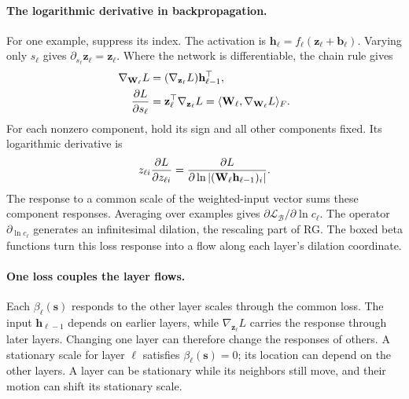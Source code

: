 \paragraph{The logarithmic derivative in backpropagation.}
For one example, suppress its index. The activation is
$\mathbf h_\ell=f_\ell(\mathbf z_\ell+\mathbf b_\ell)$.
Varying only $s_\ell$ gives
$\partial_{s_\ell}\mathbf z_\ell=\mathbf z_\ell$.
Where the network is differentiable, the chain rule gives
\[
\begin{aligned}
 \nabla_{\mathbf W_\ell}L
   &=(\nabla_{\mathbf z_\ell}L)\mathbf h_{\ell-1}^{\top},\\
 \frac{\partial L}{\partial s_\ell}
  &=\mathbf z_\ell^{\top}\nabla_{\mathbf z_\ell}L
   =\langle\mathbf W_\ell,\nabla_{\mathbf W_\ell}L\rangle_F .
\end{aligned}
\]
For each nonzero component, hold its sign and all other components
fixed. Its logarithmic derivative is
\[
 z_{\ell i}\frac{\partial L}{\partial z_{\ell i}}
   =\frac{\partial L}
          {\partial\ln|(\mathbf W_\ell\mathbf h_{\ell-1})_i|} .
\]
The response to a common scale of the weighted-input vector sums
these component responses. Averaging over examples gives
$\partial\mathcal L_{\mathcal B}/\partial\ln c_\ell$.
The operator $\partial_{\ln c_\ell}$ generates an infinitesimal
dilation, the rescaling part of RG. The boxed beta functions turn
this loss response into a flow along each layer's dilation coordinate.

\newpage
\paragraph{One loss couples the layer flows.}
Each $\beta_\ell(\mathbf s)$ responds to the other layer scales
through the common loss. The input $\mathbf h_{\ell-1}$ depends on
earlier layers, while
$\nabla_{\mathbf z_\ell}L$ carries the response through later layers.
Changing one layer can therefore change the responses of others.
A stationary scale for layer $\ell$ satisfies
$\beta_\ell(\mathbf s)=0$; its location can depend on the other
layers. A layer can be stationary while its neighbors still move,
and their motion can shift its stationary scale.

